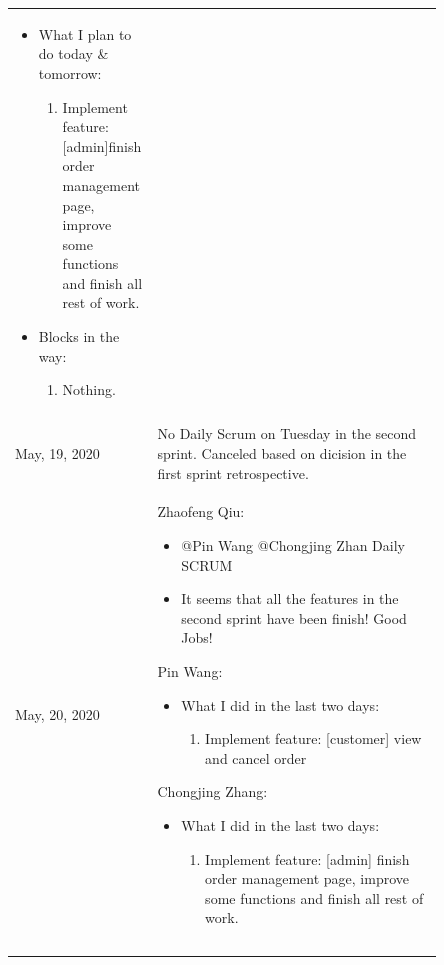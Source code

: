 \documentclass{report}
\begin{document}
\begin{tabularx}{0.95\linewidth}{%
  >{\raggedright\arraybackslash}p{0.2\linewidth}%
  >{\raggedright\arraybackslash}p{0.65\linewidth}}
\begin{itemize}
\begin{enumerate}
    \end{enumerate}
    \item What I plan to do today \& tomorrow:
      \begin{enumerate}
        \item Implement feature: [admin]finish order management page, improve some functions and finish all rest of work.
      \end{enumerate}
    \item Blocks in the way: 
      \begin{enumerate}
        \item Nothing.
      \end{enumerate}
  \end{itemize}
  \\
  \\
  \midrule
  May, 19, 2020
  & No Daily Scrum on Tuesday in the second sprint. Canceled based on dicision in the first sprint retrospective.
  \\
  \midrule
  May, 20, 2020
  & 
  Zhaofeng Qiu:
  \begin{itemize}
    \item @Pin Wang @Chongjing Zhan Daily SCRUM
    \item It seems that all the features in the second sprint have been finish! Good Jobs!
  \end{itemize}
  Pin Wang:
  \begin{itemize}
    \item What I did in the last two days: 
    \begin{enumerate}
      \item Implement feature: [customer] view and cancel order 
    \end{enumerate}
  \end{itemize}
  Chongjing Zhang:
  \begin{itemize}
    \item What I did in the last two days: 
    \begin{enumerate}
      \item Implement feature: [admin] finish order management page, improve some functions and finish all rest of work.
    \end{enumerate}
  \end{itemize}
  \\
  \bottomrule
  \\
  \caption{Daily Scrum Standup Meeting Record}  
  \label{tab:dailyScrumStandupMeetingRecord}
\end{tabularx}  
\end{document}
